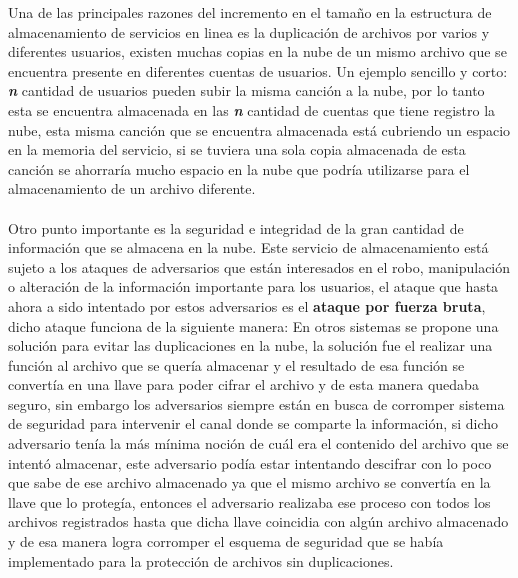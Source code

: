 Una de las principales razones del incremento en el tamaño en la estructura de almacenamiento de servicios en linea es la duplicación de archivos por varios y diferentes usuarios, existen muchas copias en la nube de un mismo archivo que se encuentra presente en diferentes cuentas de usuarios. Un ejemplo sencillo y corto:  \textbf{\textit{n}} cantidad de usuarios pueden subir la misma canción a la nube, por lo tanto esta se encuentra almacenada en las \textbf{\textit{n}} cantidad de cuentas que tiene registro la nube, esta misma canción que se encuentra almacenada está cubriendo un espacio en la memoria del servicio, si se tuviera una sola copia almacenada de esta canción se ahorraría mucho espacio en la nube que podría utilizarse para el almacenamiento de un archivo diferente. 
\\  \\
Otro punto importante es la seguridad e integridad de la gran cantidad de información que se almacena en la nube.  Este servicio de almacenamiento está sujeto a los ataques de adversarios que están interesados en el robo, manipulación o alteración de la información importante para los usuarios, el ataque que hasta ahora a sido intentado por estos adversarios es el \textbf{ataque por fuerza bruta}, dicho ataque funciona de la siguiente manera: En otros sistemas se propone una solución para evitar las duplicaciones en la nube, la solución fue el realizar una función al archivo que se quería almacenar y el resultado de esa función se convertía en una llave para poder cifrar el archivo y de esta manera quedaba seguro, sin embargo los adversarios siempre están en busca de corromper sistema de seguridad para intervenir el canal donde se comparte la información, si dicho adversario tenía la más mínima noción de cuál era el contenido del archivo que se intentó almacenar, este adversario podía estar intentando descifrar con lo poco que sabe de ese archivo almacenado ya que el mismo archivo se convertía en la llave que lo protegía, entonces el adversario realizaba ese proceso con todos los archivos registrados hasta que dicha llave coincidia con algún archivo almacenado y de esa manera logra corromper el esquema de seguridad que se había implementado para la protección de archivos sin duplicaciones. 
 

